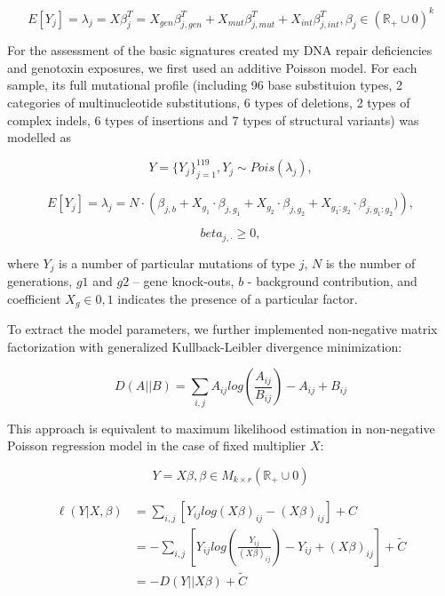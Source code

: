 \begin{equation}
E[Y_j] = \lambda_j = X \beta_{j}^{T} = X_{gen} \beta_{j,gen}^T + X_{mut} \beta_{j,mut}^T + X_{int} \beta_{j,int}^T, \beta_j \in (\mathbb{R}_{+} \cup {0})^k
\end{equation}






For the assessment of the basic signatures created my DNA repair deficiencies and 
genotoxin exposures, we first used an additive Poisson model. For each sample, its 
full mutational profile (including 96 base substituion types, 2 categories of 
multinucleotide substitutions, 6 types of deletions, 2 types of complex indels, 
6 types of insertions and 7 types of structural variants) was modelled as

\[Y = \{Y_{j}\}_{j=1}^{119}, Y_{j} \sim Pois( \lambda_{j} ),\]

\[E[Y_{j}] = \lambda_{j} = N \cdot \left( \beta_{j,b} + X_{g_{1}} \cdot \beta_{j,g_{1}} + X_{g_{2}} \cdot \beta_{j,g_2} + X_{g_1:g_2} \cdot \beta_{j,g_{1}:g_{2}} ) \right),\]

\[beta_{j,\cdot} \ge 0,\]

where $Y_{j}$ is a number of particular mutations of type $j$, $N$ is the number 
of generations, $g1$ and $g2$ – gene knock-outs, $b$ - background contribution, 
and coefficient $X_{g} \in {0,1}$ indicates the presence of a particular factor.

To extract the model parameters, we further implemented non-negative matrix 
factorization with generalized Kullback-Leibler divergence minimization:

\[D(A||B) = \sum_{i,j} A_{ij} log(\frac{A_{ij}}{B_{ij}} ) - A_{ij} + B_{ij}\]

This approach is equivalent to maximum likelihood estimation in non-negative Poisson 
regression model in the case of fixed multiplier $X$: 

\[Y = X \beta, \beta \in M_{k \times r} (\mathbb{R}_{+} \cup {0})\]

\begin{equation}
\begin{split}
\ell(Y|X,\beta) &= \sum_{i,j} \left[Y_{ij}  log⁡(X \beta)_{ij} - (X \beta)_{ij} \right] + C \\
&= - \sum_{i,j} \left[Y_{ij}  log⁡ \left( \frac{Y_{ij}}{(X\beta)_{ij}} \right) - Y_{ij} + (X\beta)_{ij} \right] + \tilde{C} \\ 
&= - D(Y||X\beta) + \tilde{C}
\end{split}
\end{equation}

